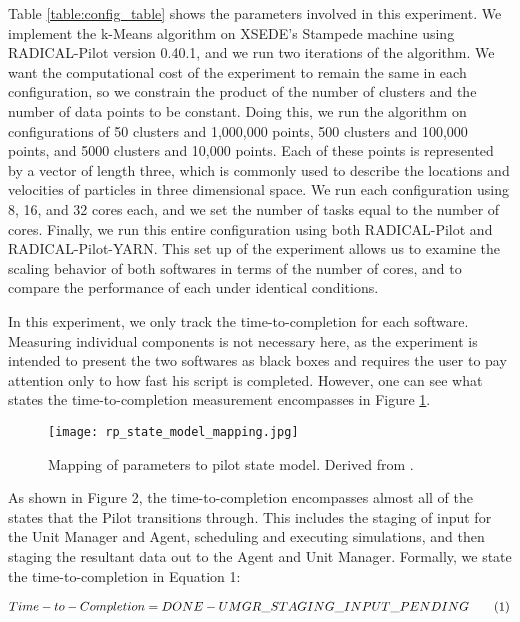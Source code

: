 \documentclass[]{article}
\newcommand\numberthis{\addtocounter{equation}{1}\tag{\theequation}}
\begin{document}
		Table \ref{table:config_table} shows the parameters involved in this experiment. We implement the k-Means algorithm on XSEDE's Stampede machine using RADICAL-Pilot version 0.40.1, and we run two iterations of the algorithm. We want the computational cost of the experiment to remain the same in each configuration, so we constrain the product of the number of clusters and the number of data points to be constant. Doing this, we run the algorithm on configurations of 50 clusters and 1,000,000 points, 500 clusters and 100,000 points, and 5000 clusters and 10,000 points. Each of these points is represented by a vector of length three, which is commonly used to describe the locations and velocities of particles in three dimensional space. We run each configuration using 8, 16, and 32 cores each, and we set the number of tasks equal to the number of cores. Finally, we run this entire configuration using both RADICAL-Pilot and RADICAL-Pilot-YARN. This set up of the experiment allows us to examine the scaling behavior of both softwares in terms of the number of cores, and to compare the performance of each under identical conditions.

		In this experiment, we only track the time-to-completion for each software. Measuring individual components is not necessary here, as the experiment is intended to present the two softwares as black boxes and requires the user to pay attention only to how fast his script is completed. However, one can see what states the time-to-completion measurement encompasses in Figure \ref{fig:pilot_state_mapping}.

		\begin{figure}[H]
			\centering
			\texttt{[image: rp\_state\_model\_mapping.jpg]}
			\caption{Mapping of parameters to pilot state model. Derived from \cite{rp_state_diagram}.}
			\label{fig:pilot_state_mapping}
		\end{figure}

		As shown in Figure 2, the time-to-completion encompasses almost all of the states that the Pilot transitions through. This includes the staging of input for the Unit Manager and Agent, scheduling and executing simulations, and then staging the resultant data out to the Agent and Unit Manager. Formally, we state the time-to-completion in Equation 1:

		\begin{align*}
			Time-to-Completion = DONE - UMGR\_STAGING\_INPUT\_PENDING \numberthis \label{1}
		\end{align*}
\end{document}
